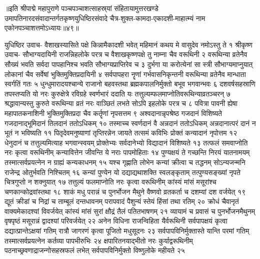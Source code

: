 ॥इति श्रीपाद्मे महापुराणे पञ्चपञ्चाशत्साहस्र्यां संहितायामुत्तरखण्डे उमापतिनारदसंवादान्तर्गतकृष्णयुधिष्ठिरसंवादे चैत्र-शुक्ल-कामदा-एकादशी-माहात्म्यं नाम एकोनपञ्चाशत्तमोऽध्यायः॥४९॥



युधिष्ठिर उवाच-
वैशाखस्यासिते पक्षे किन्नामैकादशी भवेत् 
महिमानं कथय मे वासुदेव नमोऽस्तु ते १
श्रीकृष्ण उवाच-
सौभाग्यदायिनी राजन्निहलोके परत्र च 
वैशाखकृष्णपक्षे तु नाम्ना चैव वरूथिनी २
वरूथिन्या व्रतेनैव सौख्यं भवति सर्वदा 
पापहानिश्च भवति सौभाग्यप्राप्तिरेव च ३
दुर्भगा या करोत्येनां सा स्त्री सौभाग्यमाप्नुयात् 
लोकानां चैव सर्वेषां भुक्तिमुक्तिप्रदायिनी ४
सर्वपापहरा नॄणां गर्भवासनिकृन्तनी 
वरूथिन्या व्रतेनैव मान्धाता स्वर्गतिं गतः ५
धुन्धुमारादयश्चान्ये राजानो बहवस्तथा 
ब्रह्मकपालनिर्मुक्तो बभूव भगवान्भवः ६
दशवर्षसहस्राणि तपस्तप्यति यो नरः 
कुरुक्षेत्रे  रविग्रहे स्वर्णभारं ददाति यः 
तत्तुल्यम्फलमाप्नोतिवरूथिन्याव्रतञ्चरन् ७
श्रद्धावान्यस्तु कुरुते वरूथिन्या व्रतं नरः 
वाञ्छितं लभते सोऽपि इहलोके परत्र च ८
पवित्रा पावनी ह्येषा महापातकनाशिनी 
भुक्तिमुक्तिप्रदा चैव कर्तॄणां नृपसत्तम ९
अश्वदानान्नृपश्रेष्ठ गजदानं विशिष्यते 
गजदानाद्भूमिदानं तिलदानं ततोऽधिकम् १०
तस्माच्च स्वर्णदानं वै अन्नदानं ततोऽधिकम् 
अन्नदानात्परं दानं न भूतं न भविष्यति ११
पितृदेवमनुष्याणां तृप्तिरन्नेन जायते 
तत्समं कविभिः प्रोक्तं कन्यादानं नृपोत्तम १२
धेनुदानं च तत्तुल्यमित्याह भगवान्स्वयम् 
प्रोक्तेभ्यः सर्वदानेभ्यो विद्यादानं विशिष्यते १३
तत्फलं समवाप्नोति नरः कृत्वा वरूथिनीम् 
कन्यावित्तेन जीवन्ति ये नराः पापमोहिताः १४
पुण्यक्षयं ते गच्छन्ति निरयं यातनामयम् 
तस्मात्सर्वप्रयत्नेन न ग्राह्यं कन्यकाधनम् १५
यश्च गृह्णाति लोभेन कन्यां क्रीत्वा च तद्धनम् 
सोऽन्यजन्मनि राजेन्द्र ओतुर्भवति निश्चितम् १६
कन्यां पुण्येन यो दद्याद्यथाशक्ति स्वलङ्कृताम् 
तत्पुण्यसङ्ख्यां नृपते चित्रगुप्तो न शक्नुयात् १७
तत्तुल्यं फलमाप्नोति नरः कृत्वा वरूथिनीम् 
कांस्यं मांसं मसूरांश्च चणकान्कोद्रवांस्तथा १८
शाकं मधु परान्नं च पुनर्भोजन मैथुने 
वैष्णवो व्रतकर्ता च दशम्यां दश वर्जयेत् १९
द्यूतं क्रीडां च निद्रां च ताम्बूलं दन्तधावनम् 
परापवादं पैशुन्यं स्तेयं हिंसां तथा रतिम् २०
क्रोधं चैवानृतं वाक्यमेकादश्यां विवर्जयेत् 
कांस्यं मांसं सुरां क्षौद्रं  तैलं पतितभाषणम् २१
व्यायामं च प्रवासं च पुनर्भोजनमैथुनम् 
वृषपृष्ठं मसूरान्नं द्वादश्यां परिवर्जयेत् २२
अनेन विधिना राजन्विहिता यैर्वरूथिनी 
सर्वपापक्षयं कृत्वा दद्यात्प्रान्तेऽक्षयां गतिम् 
रात्रौ जागरणं कृत्वा पूजितो मधुसूदनः २३
सर्वपापविनिर्मुक्तास्ते यान्ति परमां गतिम् 
तस्मात्सर्वप्रयत्नेन कर्तव्या पापभीरुभिः २४
क्षपारितनयाद्भीतो नरः कुर्याद्वरूथिनीम् 
पठनाच्छ्रवणाद्राजन्गोसहस्रफलं लभेत् 
सर्वपापविनिर्मुक्तो विष्णुलोके महीयते २५


